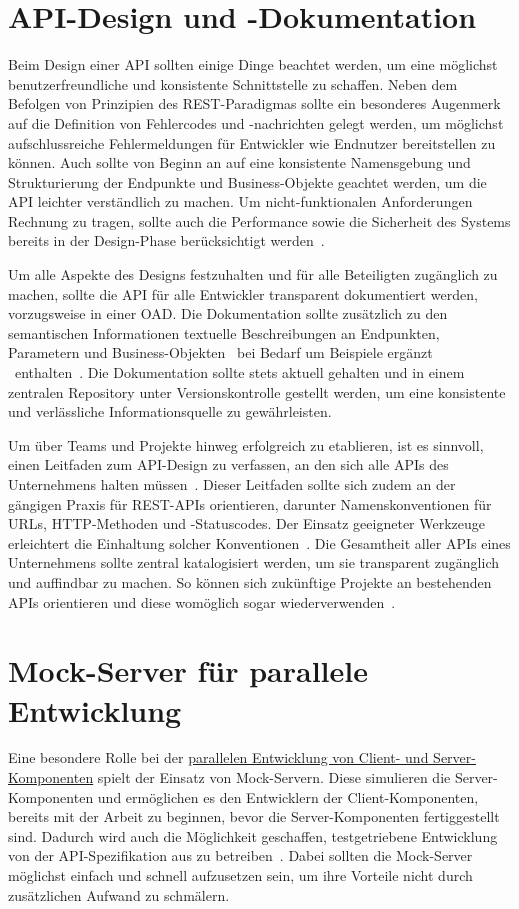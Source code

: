 \section{API-Design und -Dokumentation}
Beim Design einer \ac{API} sollten einige Dinge beachtet werden, um eine möglichst benutzerfreundliche und konsistente Schnittstelle zu schaffen.
Neben dem Befolgen von Prinzipien des \ac{REST}-Paradigmas sollte ein besonderes Augenmerk auf die Definition von Fehlercodes und -nachrichten gelegt werden, um möglichst aufschlussreiche Fehlermeldungen für Entwickler wie Endnutzer bereitstellen zu können.
Auch sollte von Beginn an auf eine konsistente Namensgebung und Strukturierung der Endpunkte und Business-Objekte geachtet werden, um die \ac{API} leichter verständlich zu machen.
Um nicht-funktionalen Anforderungen Rechnung zu tragen, sollte auch die Performance sowie die Sicherheit des Systems bereits in der Design-Phase berücksichtigt werden~\cite[352\psq,354]{de23}.

Um alle Aspekte des Designs festzuhalten und für alle Beteiligten zugänglich zu machen, sollte die \ac{API} für alle Entwickler transparent dokumentiert werden, vorzugsweise in einer \ac{OAD}.
Die Dokumentation sollte zusätzlich zu den semantischen Informationen textuelle Beschreibungen an Endpunkten, Parametern und Business-Objekten \textendash\ bei Bedarf um Beispiele ergänzt \textendash\ enthalten~\cite[353]{de23}.
Die Dokumentation sollte stets aktuell gehalten und in einem zentralen Repository unter Versionskontrolle gestellt werden, um eine konsistente und verlässliche Informationsquelle zu gewährleisten.

Um \AF über Teams und Projekte hinweg erfolgreich zu etablieren, ist es sinnvoll, einen Leitfaden zum \ac{API}-Design zu verfassen, an den sich alle \acp{API} des Unternehmens halten müssen~\cites[359]{de23}[3\psq]{kul23}.
Dieser Leitfaden sollte sich zudem an der gängigen Praxis für \ac{REST}-\acp{API} orientieren, darunter Namenskonventionen für \acp{URL}, \ac{HTTP}-Methoden und -Statuscodes.
Der Einsatz geeigneter Werkzeuge erleichtert die Einhaltung solcher Konventionen~\cite[360]{de23}.
Die Gesamtheit aller \acp{API} eines Unternehmens sollte zentral katalogisiert werden, um sie transparent zugänglich und auffindbar zu machen.
So können sich zukünftige Projekte an bestehenden \acp{API} orientieren und diese womöglich sogar wiederverwenden~\cite[3]{kul23}.

\section{Mock-Server für parallele Entwicklung}
Eine besondere Rolle bei der \hyperref[sec:parallel-dev]{parallelen Entwicklung von Client- und Server-Komponenten} spielt der Einsatz von Mock-Servern.
Diese simulieren die Server-Komponenten und ermöglichen es den Entwicklern der Client-Komponenten, bereits mit der Arbeit zu beginnen, bevor die Server-Komponenten fertiggestellt sind.
Dadurch wird auch die Möglichkeit geschaffen, testgetriebene Entwicklung von der \ac{API}-Spezifikation aus zu betreiben~\cite[353]{de23}.
Dabei sollten die Mock-Server möglichst einfach und schnell aufzusetzen sein, um ihre Vorteile nicht durch zusätzlichen Aufwand zu schmälern.

